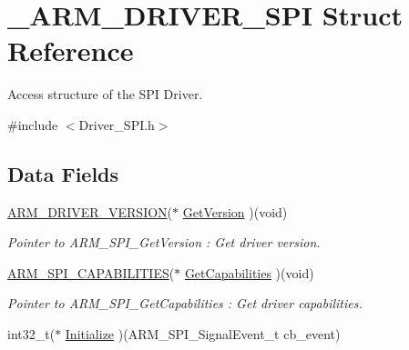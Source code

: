 \hypertarget{struct___a_r_m___d_r_i_v_e_r___s_p_i}{}\section{\+\_\+\+A\+R\+M\+\_\+\+D\+R\+I\+V\+E\+R\+\_\+\+S\+PI Struct Reference}
\label{struct___a_r_m___d_r_i_v_e_r___s_p_i}


Access structure of the S\+PI Driver.  




{\ttfamily \#include $<$Driver\+\_\+\+S\+P\+I.\+h$>$}

\subsection*{Data Fields}
\begin{DoxyCompactItemize}
\item 
\mbox{\label{struct___a_r_m___d_r_i_v_e_r___s_p_i_a30afd9cb3113c037b5f1926f5ef93b59}} 
\mbox{\hyperlink{struct___a_r_m___d_r_i_v_e_r___v_e_r_s_i_o_n}{A\+R\+M\+\_\+\+D\+R\+I\+V\+E\+R\+\_\+\+V\+E\+R\+S\+I\+ON}}($\ast$ \mbox{\hyperlink{struct___a_r_m___d_r_i_v_e_r___s_p_i_a30afd9cb3113c037b5f1926f5ef93b59}{Get\+Version}} )(void)
\begin{DoxyCompactList}\small\item\em Pointer to A\+R\+M\+\_\+\+S\+P\+I\+\_\+\+Get\+Version \+: Get driver version. \end{DoxyCompactList}\item 
\mbox{\label{struct___a_r_m___d_r_i_v_e_r___s_p_i_a806a8a77ab11c714b769a754501c6062}} 
\mbox{\hyperlink{struct___a_r_m___s_p_i___c_a_p_a_b_i_l_i_t_i_e_s}{A\+R\+M\+\_\+\+S\+P\+I\+\_\+\+C\+A\+P\+A\+B\+I\+L\+I\+T\+I\+ES}}($\ast$ \mbox{\hyperlink{struct___a_r_m___d_r_i_v_e_r___s_p_i_a806a8a77ab11c714b769a754501c6062}{Get\+Capabilities}} )(void)
\begin{DoxyCompactList}\small\item\em Pointer to A\+R\+M\+\_\+\+S\+P\+I\+\_\+\+Get\+Capabilities \+: Get driver capabilities. \end{DoxyCompactList}\item 
\mbox{\label{struct___a_r_m___d_r_i_v_e_r___s_p_i_a31866b083830420451c5ca7049166698}} 
int32\+\_\+t($\ast$ \mbox{\hyperlink{struct___a_r_m___d_r_i_v_e_r___s_p_i_a31866b083830420451c5ca7049166698}{Initialize}} )(A\+R\+M\+\_\+\+S\+P\+I\+\_\+\+Signal\+Event\+\_\+t cb\+\_\+event)

\end{DoxyCompactItemize}
